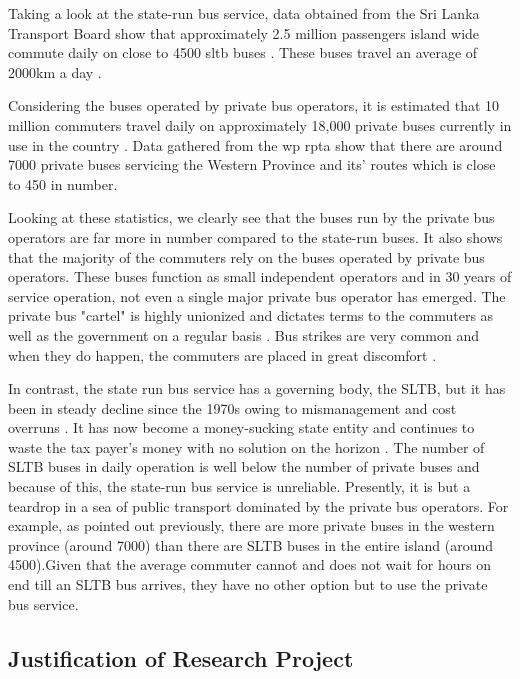 Taking a look at the state-run bus service, data obtained from the Sri Lanka Transport Board show that approximately 2.5 million passengers island wide commute daily on close to 4500 \acrshort{sltb} buses \cite{SriLankaTransportBoard2010}. These buses travel an average of 2000km a day \cite{SriLankaTransportBoard2012}. 

Considering the buses operated by private bus operators, it is estimated that 10 million commuters travel daily on approximately 18,000 private buses currently in use in the country \cite{Silva2010}. Data gathered from the \acrshort{wp} \acrshort{rpta} show that there are around 7000 private buses servicing the Western Province and its' routes which is close to 450 in number. 

Looking at these statistics, we clearly see that the buses run by the private bus operators are far more in number compared to the state-run buses. It also shows that the majority of the commuters rely on the buses operated by private bus operators. These buses function as small independent operators and in 30 years of service operation, not even a single major private bus operator has emerged. The private bus "cartel" is highly unionized and dictates terms to the commuters as well as the government on a regular basis \cite{AdaDerana2012}. Bus strikes are very common and when they do happen, the commuters are placed in great discomfort \cite{Samarajiva2012, ColomboPage2012}.

In contrast, the state run bus service has a governing body, the SLTB, but it has been in steady decline since the 1970s owing to mismanagement and cost overruns \cite{AnswersDotCom2012}. It has now become a money-sucking state entity and continues to waste the tax payer's money with no solution on the horizon \cite{LBO2011, Sirimanne2013}. The number of SLTB buses in daily operation is well below the number of private buses and because of this, the state-run bus service is unreliable. Presently, it is but a teardrop in a sea of public transport dominated by the private bus operators. For example, as pointed out previously, there are more private buses in the western province (around 7000) than there are SLTB buses in the entire island (around 4500).Given that the average commuter cannot and does not wait for hours on end till an SLTB bus arrives, they have no other option but to use the private bus service. \cite{Wijayapala2012, Azwer2012}

\subsection{Justification of Research Project}

